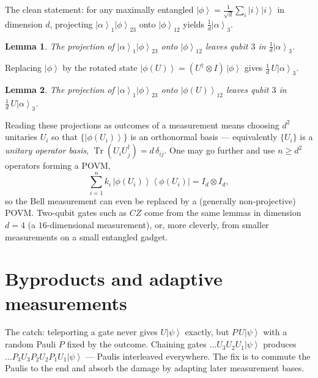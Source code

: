 \documentclass[11pt]{article}
\newcommand{\ket}[1]{\left|#1\right\rangle}
\newcommand{\bra}[1]{\left\langle#1\right|}
\newcommand{\Tr}{\operatorname{Tr}}
\theoremstyle{plain}
\newtheorem{lemma}{Lemma}
\begin{document}
The clean statement: for any maximally entangled $\ket{\phi}=\tfrac{1}{\sqrt d}\sum_{i}\ket{i}\ket{i}$
in dimension $d$, projecting $\ket{\alpha}_1\ket{\phi}_{23}$ onto $\ket{\phi}_{12}$ yields
$\tfrac1d\ket{\alpha}_3$.

\begin{lemma}
The projection of $\ket{\alpha}_1\ket{\phi}_{23}$ onto $\ket{\phi}_{12}$ leaves qubit $3$ in
$\tfrac1d\ket{\alpha}_3$.
\end{lemma}

Replacing $\ket{\phi}$ by the rotated state $\ket{\phi(U)} = (U^\dagger \otimes I)\,\ket{\phi}$
gives $\tfrac1d\,U\ket{\alpha}_3$.

\begin{lemma}
The projection of $\ket{\alpha}_1\ket{\phi}_{23}$ onto $\ket{\phi(U)}_{12}$ leaves qubit $3$ in
$\tfrac1d\,U\ket{\alpha}_3$.
\end{lemma}

Reading these projections as outcomes of a measurement means choosing $d^2$ unitaries $U_i$ so
that $\{\ket{\phi(U_i)}\}$ is an orthonormal basis --- equivalently $\{U_i\}$ is a
\emph{unitary operator basis}, $\Tr(U_i U_j^\dagger)=d\,\delta_{ij}$. One may go further and use
$n\ge d^2$ operators forming a POVM,
\[ \sum_{i=1}^{n} k_i\,\ket{\phi(U_i)}\bra{\phi(U_i)} = I_d \otimes I_d, \]
so the Bell measurement can even be replaced by a (generally non-projective) POVM. Two-qubit gates
such as $CZ$ come from the same lemmas in dimension $d=4$ (a $16$-dimensional measurement), or, more
cleverly, from smaller measurements on a small entangled gadget.

\section{Byproducts and adaptive measurements}
The catch: teleporting a gate never gives $U\ket{\psi}$ exactly, but $P\,U\ket{\psi}$ with a random
Pauli $P$ fixed by the outcome. Chaining gates $\dots U_3 U_2 U_1\ket{\psi}$ produces
$\dots P_3 U_3 P_2 U_2 P_1 U_1\ket{\psi}$ --- Paulis interleaved everywhere. The fix is to commute the
Paulis to the end and absorb the damage by adapting later measurement bases.
\end{document}
